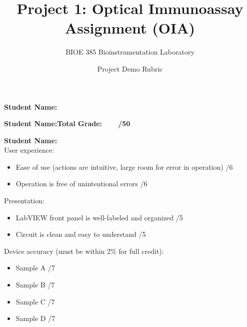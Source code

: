 \documentclass{article}
\title{Project 1: Optical Immunoassay Assignment (OIA)}
\author{BIOE 385 Bioinstrumentation Laboratory}
\date{Project Demo Rubric}
\begin{document}
\large
\maketitle

\textbf{Student Name:}\vspace{0.5cm}

\textbf{Student Name:}\hfill 	\textbf{Total Grade:\ \ \ \ \underline{\hspace{1cm}}/50}\vspace{0.5cm}

\textbf{Student Name:}\hfill\\

User experience:
\begin{itemize}
	\item Ease of use (actions are intuitive, large room for error in operation) \hfill \underline{\hspace{1cm}}/6 \vspace{2cm}
	\item Operation is free of unintentional errors \hfill \underline{\hspace{1cm}}/6\vspace{2cm}
\end{itemize}

Presentation:
\begin{itemize}
	\item LabVIEW front panel is well-labeled and organized \hfill \underline{\hspace{1cm}}/5 \vspace{2cm}
	\item Circuit is clean and easy to understand \hfill \underline{\hspace{1cm}}/5 \vspace{2cm}
\end{itemize}


Device accuracy (must be within 2\% for full credit):
\begin{itemize}
	\item Sample A \underline{\hspace{3cm}} \hfill \underline{\hspace{1cm}}/7
	\item Sample B \underline{\hspace{3cm}} \hfill \underline{\hspace{1cm}}/7
	\item Sample C \underline{\hspace{3cm}} \hfill \underline{\hspace{1cm}}/7
	\item Sample D \underline{\hspace{3cm}} \hfill \underline{\hspace{1cm}}/7
\end{itemize}
\end{document}
